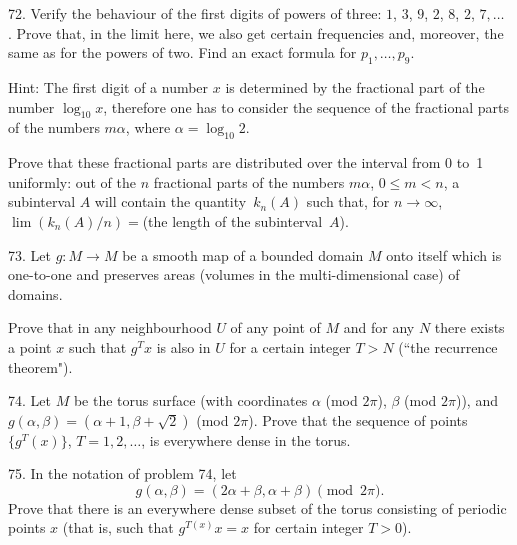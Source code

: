 \begin{problem}{72.}
	Verify the behaviour of the first digits of powers of three: $1$,
	$3$, $9$, $2$, $8$, $2$, $7, \dots$ . Prove that, in the limit here, we also 
	get certain frequencies and, moreover, the same as for the powers of two.
	Find an exact formula for $p_1, \dots, p_9$.

	\medskip
	\begin{note}{Hint:}
		The first digit of a number $x$ is determined by the fractional part
		of the number $\log_{10} x$, therefore one has to consider the sequence of the fractional parts of
		the numbers $m \alpha$, where $\alpha=\log_{10} 2$.
	\end{note}

	Prove that these fractional parts are distributed over the interval from 0 to~1
	uniformly: out of the $n$ fractional parts of the numbers $m \alpha$, $0 \leqslant m<n$,
	a subinterval $A$ will contain the quantity~$k_n (A)$ such that, for $n \to \infty$,
	$\lim (k_n (A)/n)={}$(the length of the subinterval~$A$).
\end{problem}

\begin{problem}{73.}
	Let $g\colon M \to M$ be a smooth map of a bounded domain $M$ onto itself which
	is one-to-one and preserves areas (volumes in the multi-dimensional case) of domains.

	Prove that in any neighbourhood $U$ of any point of $M$ and for any $N$ there exists a point $x$
	such that $g^T x$ is also in $U$ for a certain integer $T>N$ (``the recurrence theorem").
\end{problem}

\begin{problem}{74.}
	Let $M$ be the torus surface (with coordinates $\alpha$ (mod $2\pi$), $\beta$ (mod $2\pi$)), 
	and $g(\alpha, \beta)=(\alpha+1, \beta+ \sqrt{2})$ (mod $2\pi$). Prove that the sequence of points
	$\{g^T (x)\}$, $T=1, 2, \dots$, is everywhere dense in the torus.
\end{problem}

\begin{problem}{75.}
	In the notation of problem 74, let
	$$
	g(\alpha, \beta)=(2\alpha+\beta,\alpha+\beta) \pmod {2\pi}.
	$$ 
	Prove that there is an everywhere dense subset of the torus consisting of periodic points $x$ (that is, such that 
	$g^{T (x)} x=x$ for certain integer $T>0$).
\end{problem}

